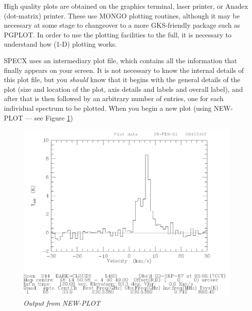 \documentclass[11pt,twoside]{report}
\begin{document}
High quality plots are obtained on the graphics terminal, laser printer, or Anadex
(dot-matrix) printer. These use
MONGO plotting routines, although it may be necessary at some
stage to changeover to a more GKS-friendly package such as
PGPLOT. In order to use the plotting facilities to the full, it
is necessary to understand how (1-D) plotting works.

SPECX uses an intermediary plot file, which contains all the
information that finally appears on your screen. It is not necessary to know
the internal details of this plot file, but you {\em should} know that it
begins with the general details of the plot (size and location of the plot,
axis details and labels and overall label), and after that is then followed by
an arbitrary number of entries, one for each individual spectrum to be plotted.
When you begin a new plot (using NEW-PLOT --- see Figure \ref{NEW})
\begin{figure}[htbp]
\begin{center}
\includegraphics[scale=0.65]{new-plot}
\protect\parbox{5.5in}
{\caption[NEW]
{\sl
Output from NEW-PLOT
\label{NEW}
}
}
\end{center}
\end{figure}
\end{document}
